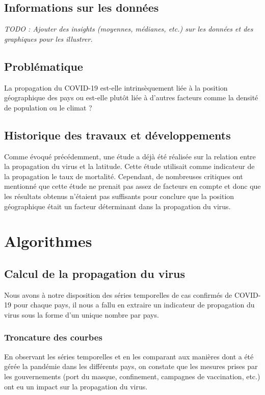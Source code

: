 \documentclass[12pt]{iEEEtran}
\begin{document}
\subsection{Informations sur les données}
\textit{TODO : Ajouter des insights (moyennes, médianes, etc.) sur les données et
des graphiques pour les illustrer.}

\subsection{Problématique}
La propagation du COVID-19 est-elle intrinsèquement liée à la position géographique des pays
ou est-elle plutôt liée à d'autres facteurs comme la densité de population ou le climat ?

\subsection{Historique des travaux et développements}
Comme évoqué précédemment, une étude \cite{kaggle} a déjà été réalisée sur la relation entre
la propagation du virus et la latitude. Cette étude utilisait comme indicateur de la propagation
le taux de mortalité. Cependant, de nombreuses critiques ont mentionné que cette étude ne prenait
pas assez de facteurs en compte et donc que les résultats obtenus n'étaient pas suffisants pour
conclure que la position géographique était un facteur déterminant dans la propagation du virus.

\section{Algorithmes}
\subsection{Calcul de la propagation du virus}

Nous avons à notre disposition des séries temporelles de cas confirmés de COVID-19 pour chaque
pays, il nous a fallu en extraire un indicateur de propagation du virus sous la forme d'un
unique nombre par pays.

\subsubsection{Troncature des courbes}
En observant les séries temporelles et en les comparant aux manières dont a été gérée la pandémie
dans les différents pays, on constate que les mesures prises par les gouvernements (port du masque,
confinement, campagnes de vaccination, etc.) ont eu un impact sur la propagation du virus.
\end{document}
